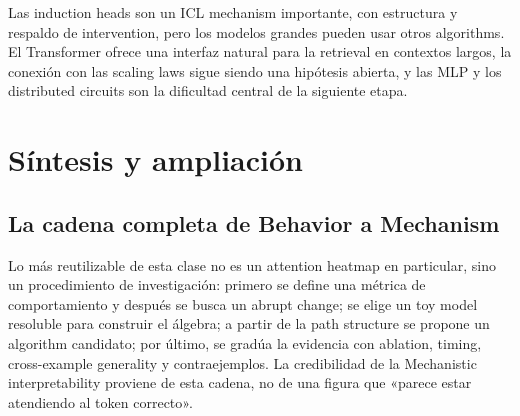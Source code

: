 \documentclass[a4paper]{article}
\begin{document}
Las induction heads son un ICL mechanism importante, con estructura y respaldo de intervention, pero los modelos grandes pueden usar otros algorithms. El Transformer ofrece una interfaz natural para la retrieval en contextos largos, la conexión con las scaling laws sigue siendo una hipótesis abierta, y las MLP y los distributed circuits son la dificultad central de la siguiente etapa.

\section{Síntesis y ampliación}

\subsection{La cadena completa de Behavior a Mechanism}

Lo más reutilizable de esta clase no es un attention heatmap en particular, sino un procedimiento de investigación: primero se define una métrica de comportamiento y después se busca un abrupt change; se elige un toy model resoluble para construir el álgebra; a partir de la path structure se propone un algorithm candidato; por último, se gradúa la evidencia con ablation, timing, cross-example generality y contraejemplos. La credibilidad de la Mechanistic interpretability proviene de esta cadena, no de una figura que «parece estar atendiendo al token correcto».
\end{document}
